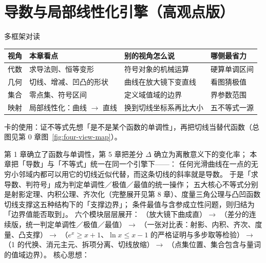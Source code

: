 
\section{导数与局部线性化引擎（高观点版）}

\begin{methodbox}{多框架对读}
\small
\begin{center}
\begin{tabular}{c|p{2.9cm}|p{5.0cm}|p{3.1cm}}
\toprule
视角 & 本章看点 & 别的视角怎么说 & 哪侧最省力 \\
\midrule
代数 & 求导法则、恒等变形 & 符号对象的机械运算 & 硬算单调区间 \\
几何 & 切线、增减、凹凸的形状 & 曲线在放大镜下变直线 & 看图猜极值 \\
集合 & 零点集、符号区间 & 定义域值域的边界 & 界参数范围 \\
映射 & 局部线性化：曲线 $\to$ 直线 & 换到切线坐标系再比大小 & 五不等式一源 \\
\bottomrule
\end{tabular}
\end{center}
卡的使用：证不等式先想「是不是某个函数的单调性」，再把切线当替代函数（总图见第 0 章图~\ref{fig:four-view-map}）。
\end{methodbox}

第 1 章确立了函数与单调性，第 5 章把差分 $\Delta$ 确立为离散意义下的变化率；
本章把「导数」与「不等式」统一在同一个引擎下——：
任何光滑曲线在一点的无穷小邻域内都可以用它的切线近似代替，而这条切线的斜率就是导数。
于是「求导数、判符号」成为判定单调性／极值／最值的统一操作；
五大核心不等式分别是射影定理、内积公理、齐次化（完整展开见第 8 章）、度量三角公理与凸凹函数切线支撑这五种结构下的「支撑边界」；
条件最值与含参成立性问题，则归结为「边界值能否取到」。
六个模块层层展开：
（放大镜下曲成直）$\to$
（差分的连续版，统一判定单调性／极值／最值）$\to$
（一张对比表：射影、内积、齐次、度量、凸支撑）$\to$
（$e^x\ge x+1$、$\ln x\le x-1$ 的严格证明与多步取等检验）$\to$
（1 的代换、消元主元、拆项分离、切线放缩）$\to$
（点集位置、集合包含与量词的值域边界）。
核心思想：

